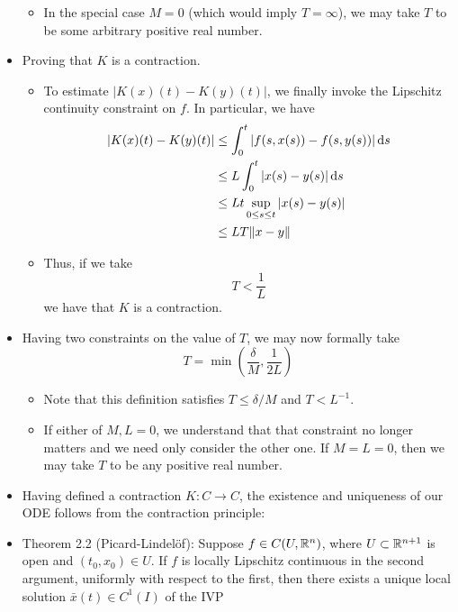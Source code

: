 \documentclass[../notes.tex]{subfiles}
\begin{document}
\begin{itemize}
\begin{itemize}
        \item In the special case $M=0$ (which would imply $T=\infty$), we may take $T$ to be some arbitrary positive real number.
    \end{itemize}
    \item Proving that $K$ is a contraction.
    \begin{itemize}
        \item To estimate $|K(x)(t)-K(y)(t)|$, we finally invoke the Lipschitz continuity constraint on $f$. In particular, we have
        \begin{align*}
            |K(x)(t)-K(y)(t)| &\leq \int_0^t|f(s,x(s))-f(s,y(s))|\dd{s}\\
            &\leq L\int_0^t|x(s)-y(s)|\dd{s}\\
            &\leq Lt\sup_{0\leq s\leq t}|x(s)-y(s)|\\
            &\leq LT\norm{x-y}
        \end{align*}
        \item Thus, if we take
        \begin{equation*}
            T < \frac{1}{L}
        \end{equation*}
        we have that $K$ is a contraction.
    \end{itemize}
    \item Having two constraints on the value of $T$, we may now formally take
    \begin{equation*}
        T = \min\left( \frac{\delta}{M},\frac{1}{2L} \right)
    \end{equation*}
    \begin{itemize}
        \item Note that this definition satisfies $T\leq\delta/M$ and $T<L^{-1}$.
        \item If either of $M,L=0$, we understand that that constraint no longer matters and we need only consider the other one. If $M=L=0$, then we may take $T$ to be any positive real number.
    \end{itemize}
    \item Having defined a contraction $K:C\to C$, the existence and uniqueness of our ODE follows from the contraction principle:
    \item Theorem 2.2 (Picard-Lindel\"{o}f): Suppose $f\in C(U,\mathbb{R}^n)$, where $U\subset\mathbb{R}^{n+1}$ is open and $(t_0,x_0)\in U$. If $f$ is locally Lipschitz continuous in the second argument, uniformly with respect to the first, then there exists a unique local solution $\bar{x}(t)\in C^1(I)$ of the IVP

\end{itemize}
\end{document}
